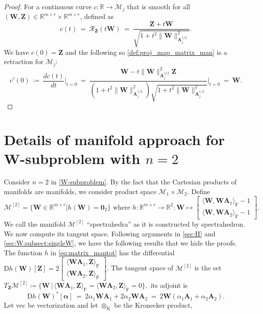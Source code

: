 \documentclass[sn-mathphys-num]{sn-jnl}
\def\zeros           {\bm{0}}            %
\def\IR  {\mathbb{R}} 	    %
\def\IRmr{\IR^{m \times r}} %
\def\A {\bm{A}}
\def\W {\bm{W}}
\def\Z {\bm{Z}}
\def\cM { \mathcal{M}}
\def\cR { \mathcal{R}}
\def\balpha   {\boldsymbol{\alpha}}
\begin{document}
\begin{proof}
For a continuous curve $c:\IR\rightarrow\cM_j$ that is smooth for all 
$(\W, \Z) \in \IRmr\times \IRmr$, defined as
\[
c(t) 
~=~
\cR_{\Z}(t\W) 
~=~ 
\dfrac{\Z + t\W}{\sqrt{1 + t^2\| \W\|_{\A_j^{1/2}}^2}}.
\]
We have $c(0)=\Z$ and the following so \eqref{def:proj_map_matrix_man} is a retraction for $\cM_j$:
\[
c'(0) 
~\coloneqq~
\dfrac{d c(t)}{d t}\bigg|_{t=0}
~=~
\dfrac{\W-t\| \W\|_{\A_j^{1/2}}^2\Z}{(1+t^2\|\W\|_{\A_j^{1/2}}^2)\sqrt{1+t^2\|\W\|_{\A_j^{1/2}}^2}}\bigg|_{t=0} 
~=~
\W.
\]
\end{proof}





\section{Details of manifold approach for W-subproblem with $n=2$}\label{sec:app:efficient_RgradW:n2}
Consider $n=2$ in \eqref{W-subproblem}.
By the fact that the Cartesian products of manifolds are manifolds, we consider product space $\cM_1 \times \cM_2$.
Define
\begin{equation}\label{eq:matrix_mantot}
\cM^{[2]}
=
\Big\{
\W\in\IRmr \big|
h(\W) = \zeros_2
\Big\}
\text{ where }
h:\IRmr\rightarrow\IR^2 :
\W \mapsto 
\begin{bmatrix}
\langle\W,\W\A_1\rangle_\textrm{F}-1
\\
\langle\W,\W\A_2\rangle_\textrm{F}-1
\end{bmatrix}.
\tag{Spectrahedra}
\end{equation}
We call the manifold $\cM^{[2]}$ ``spectrahedra'' as it is constructed by spectrahedron.
We now compute its tangent space.
Following arguments in \textsection\ref{sec:H} and \textsection\ref{sec:W:subsect:singleW}, we have the following results that we hide the proofs.
The function $h$ in \eqref{eq:matrix_mantot} has the differential $\textrm{D}h(\W)[\Z] = 2\begin{bmatrix}
\langle\W\A_1, \Z\rangle_\textrm{F}
\\
\langle\W\A_2, \Z\rangle_\textrm{F}
\end{bmatrix}$.
The tangent space of $\cM^{[2]}$ is the set 
$
T_{\Z}\cM^{[2]} 
\coloneqq
\Big\{ 
\W \,\big|\, \langle\W\A_1, \Z\rangle_\textrm{F} = \langle\W\A_2, \Z\rangle_\textrm{F} = 0
\Big\},
$
its adjoint is
\[
\textrm{D}h(\W)^*[{\balpha}]
~=~
2\alpha_1\W\A_1 + 2\alpha_2\W\A_2 
~=~
2\W (\alpha_1\A_1 + \alpha_2\A_2).
\]
Let \textrm{vec} be vectorization and 
let $\otimes_{\text{K}}$ be the Kronecker product,
\end{document}
